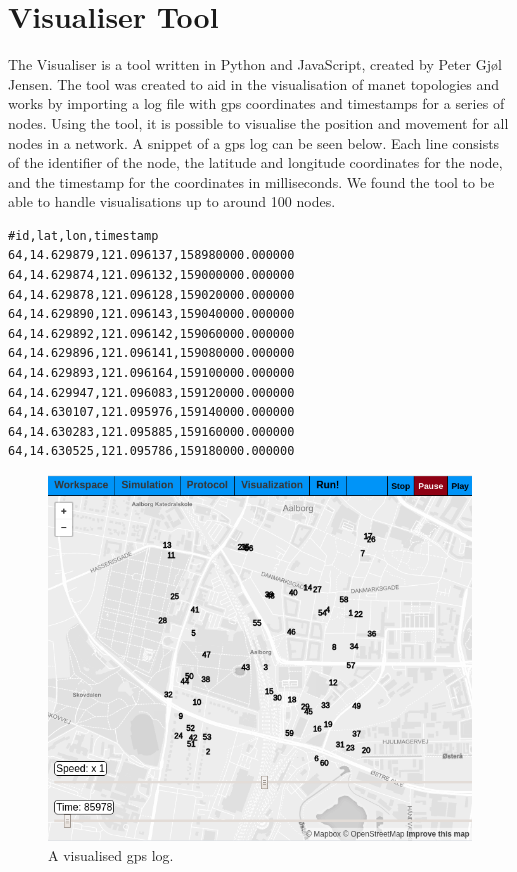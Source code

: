 \section{Visualiser Tool}\label{sec:visualiser}
The Visualiser is a tool written in Python and JavaScript, created by Peter Gjøl Jensen. The tool was created
to aid in the visualisation of \gls{manet} topologies and works by importing a log file with \acrshort{gps}
coordinates and timestamps for a series of nodes. Using the tool, it is possible to visualise the position and
movement for all nodes in a network. A snippet of a \acrshort{gps} log can be seen below. Each line consists
of the identifier of the node, the latitude and longitude coordinates for the node, and the timestamp for the
coordinates in milliseconds. We found the tool to be able to handle visualisations up to around 100 nodes.
%
\begin{verbatim}
#id,lat,lon,timestamp
64,14.629879,121.096137,158980000.000000
64,14.629874,121.096132,159000000.000000
64,14.629878,121.096128,159020000.000000
64,14.629890,121.096143,159040000.000000
64,14.629892,121.096142,159060000.000000
64,14.629896,121.096141,159080000.000000
64,14.629893,121.096164,159100000.000000
64,14.629947,121.096083,159120000.000000
64,14.630107,121.095976,159140000.000000
64,14.630283,121.095885,159160000.000000
64,14.630525,121.095786,159180000.000000
\end{verbatim}

\begin{figure}[H]
    \centering
    \includegraphics[width=.8\textwidth]{figures/visualiser/gpslog.png}
    \caption{A visualised \acrshort{gps} log.}
    \label{figure:gpslogvisualised}
\end{figure}

